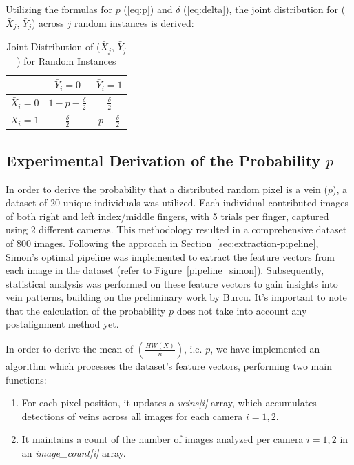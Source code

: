 \newpage
Utilizing the formulas for \(p\) (\ref{eq:p}) and $\delta$ (\ref{eq:delta}), the joint distribution for (\(\bar{X}_j\), \(\bar{Y}_j\)) across \(j\) random instances is derived:

\begin{table}[H]
    \centering
    \renewcommand{\arraystretch}{1.5}
    \begin{tabular}{|c|c|c|}
        \hline
        & $\bar{Y}_i = 0$ & $\bar{Y}_i = 1$\\
        \hline
        $\bar{X}_i = 0$ & $1 - p - \frac{\delta}{2}$ & $\frac{\delta}{2}$\\
        \hline
        $\bar{X}_i = 1$ & $\frac{\delta}{2}$ & $p - \frac{\delta}{2}$\\
        \hline
    \end{tabular}
    \caption{Joint Distribution of ($\bar{X}_j$, $\bar{Y}_j$) for Random Instances}
    \label{tab:joint_distribution}
\end{table}



\subsection{Experimental Derivation of the Probability \(p\)}
\label{sec:p}
In order to derive the probability that a distributed random pixel is a vein (\(p\)), a dataset of 20 unique individuals was utilized. Each individual contributed images of both right and left index/middle fingers, with 5 trials per finger, captured using 2 different cameras. This methodology resulted in a comprehensive dataset of 800 images. Following the approach in Section~\ref{sec:extraction-pipeline}, Simon's optimal pipeline was implemented to extract the feature vectors from each image in the dataset (refer to Figure~\ref{pipeline_simon}). Subsequently, statistical analysis was performed on these feature vectors to gain insights into vein patterns, building on the preliminary work by Burcu. It's important to note that the calculation of the probability \(p\) does not take into account any postalignment method yet.

In order to derive the mean of \(\left( \frac{HW(X)}{n} \right)\), i.e. \(p\), we have implemented an algorithm which processes the dataset's feature vectors, performing two main functions:
\begin{enumerate}
    \item For each pixel position, it updates a \textit{veins[i]} array, which accumulates detections of veins across all images for each camera \(i={1,2}\).
    \item It maintains a count of the number of images analyzed per camera \(i={1,2}\) in an \textit{image\_count[i]} array.
\end{enumerate}


